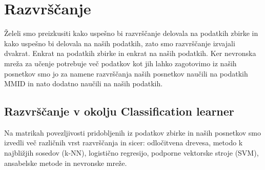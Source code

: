 \section{Razvrščanje}
Želeli smo preizkusiti kako uspešno bi razvrščanje delovala na podatkih zbirke in kako uspešno bi delovala na naših podatkih, zato smo razvrščanje izvajali dvakrat. Enkrat na podatkih zbirke in enkrat na naših podatkih. Ker nevronska mreža za učenje potrebuje več podatkov kot jih lahko zagotovimo iz naših posnetkov smo jo za namene razvrščanja naših posnetkov naučili na podatkih MMID in nato dodatno naučili na naših podatkih. 

\subsection{Razvrščanje v okolju Classification learner}
Na matrikah povezljivosti pridobljenih iz podatkov zbirke in naših posnetkov smo izvedli več različnih vrst razvrščanja in sicer: odločitvena drevesa, metodo k najbližjih sosedov (k-NN), logistično regresijo, podporne vektorske stroje (SVM), ansabelske metode in nevronske mreže.


